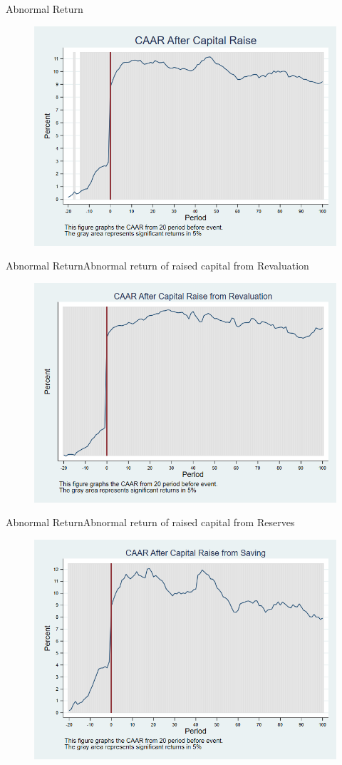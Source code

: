 \documentclass{beamer}
\begin{document}
\begin{frame}{Abnormal Return}
\label{car_market}
\begin{figure}
\centering
\includegraphics[width=0.7\linewidth]{Output/car_market.png}
\label{fig:car_market}
\end{figure}
\end{frame}

\begin{frame}{Abnormal Return}{Abnormal return of raised capital from Revaluation}
\label{car_marketRevaluation}
\begin{figure}
\centering
\includegraphics[width=0.65\linewidth]{Output/car_marketRevaluation}
\label{fig:car_marketRevaluation}
\end{figure}

\end{frame}


\begin{frame}{Abnormal Return}{Abnormal return of raised capital from Reserves}
\label{car_marketSaving}
\begin{figure}
\centering
\includegraphics[width=0.65\linewidth]{Output/car_marketSaving}
\label{fig:car_marketSaving}
\end{figure}

\end{frame}
\end{document}
